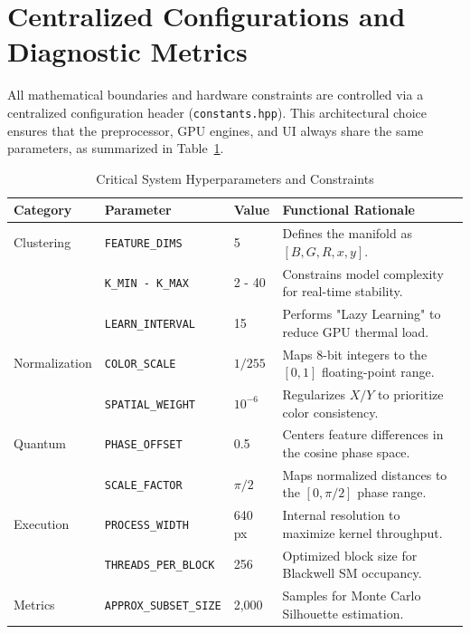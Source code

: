 \section{Centralized Configurations and Diagnostic Metrics}
All mathematical boundaries and hardware constraints are controlled via a centralized configuration header (\texttt{constants.hpp}). This architectural choice ensures that the preprocessor, GPU engines, and UI always share the same parameters, as summarized in Table~\ref{tab:hyperparameters}.

\begin{table}[htbp]
\centering
\small
\caption[Critical System Hyperparameters and Functional Rationale]{Critical System Hyperparameters and Constraints}
\label{tab:hyperparameters}
    \begin{tabular}{lllp{6cm}}
    \hline
        \textbf{Category} & \textbf{Parameter} & \textbf{Value} & \textbf{Functional Rationale} \\ \hline
        Clustering & \texttt{FEATURE\_DIMS} & 5 & Defines the manifold as $[B, G, R, x, y]$. \\
         & \texttt{K\_MIN - K\_MAX} & 2 - 40 & Constrains model complexity for real-time stability. \\
         & \texttt{LEARN\_INTERVAL} & 15 & Performs "Lazy Learning" to reduce GPU thermal load. \\ \hline
        Normalization & \texttt{COLOR\_SCALE} & $1/255$ & Maps 8-bit integers to the $[0, 1]$ floating-point range. \\
         & \texttt{SPATIAL\_WEIGHT} & $10^{-6}$ & Regularizes $X/Y$ to prioritize color consistency. \\ \hline
        Quantum & \texttt{PHASE\_OFFSET} & 0.5 & Centers feature differences in the cosine phase space. \\
         & \texttt{SCALE\_FACTOR} & $\pi/2$ & Maps normalized distances to the $[0, \pi/2]$ phase range. \\ \hline
        Execution & \texttt{PROCESS\_WIDTH} & 640 px & Internal resolution to maximize kernel throughput. \\
          & \texttt{THREADS\_PER\_BLOCK} & 256 & Optimized block size for Blackwell SM occupancy. \\ \hline
        Metrics & \texttt{APPROX\_SUBSET\_SIZE} & 2,000 & Samples for Monte Carlo Silhouette estimation. \\ \hline
    \end{tabular}
\end{table}


